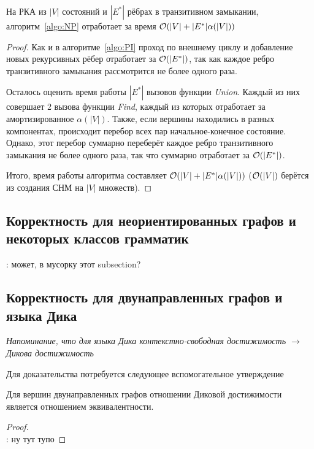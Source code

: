 \begin{theorem}
  На РКА из $|V|$ состояний и $|E^{*}|$ рёбрах в транзитивном замыкании, алгоритм~\ref{algo:NP} отработает за время $\mathcal{O}(|V| + |E^{*}| \alpha(|V|))$
\end{theorem}

\begin{proof}
  Как и в алгоритме~\ref{algo:PI} проход по внешнему циклу и добавление новых рекурсивных рёбер отработает за $\mathcal{O}(|E^{*}|)$, так как каждое ребро транзитивного замыкания рассмотрится не более одного раза.

  Осталось оценить время работы $|E^{*}|$ вызовов функции \textit{Union}. Каждый из них совершает 2 вызова функции \textit{Find}, каждый из которых отработает за амортизированное $\alpha(|V|)$. Также, если вершины находились в разных компонентах, происходит перебор всех пар начальное-конечное состояние. Однако, этот перебор суммарно переберёт каждое ребро транзитивного замыкания не более одного раза, так что суммарно отработает за $\mathcal{O}(|E^{*}|)$.

  Итого, время работы алгоритма составляет $\mathcal{O}(|V| + |E^{*}| \alpha(|V|))$ ($\mathcal{O}(|V|)$ берётся из создания СНМ на $|V|$ множеств). 
\end{proof}

\subsection{Корректность для неориентированных графов и некоторых классов грамматик}

\TODO: может, в мусорку этот subsection?

\subsection{Корректность для двунаправленных графов и языка Дика}

\textit{Напоминание, что для языка Дика контекстно-свободная достижимость $\to$ Дикова достижимость}

Для доказательства потребуется следующее вспомогательное утверждение

\begin{lemma}\label{lemma:bidir_equiv}
  Для вершин двунаправленных графов отношении Диковой достижимости является отношением эквивалентности.
\end{lemma}
\begin{proof}
  ~\\
  \TODO: ну тут тупо

\end{proof}

